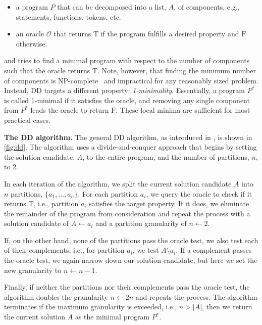 \documentclass[sigplan,screen]{acmart}
\newenvironment{vinlist}
{\begin{itemize}[leftmargin=1.5em]
  \setlength{\itemsep}{0pt}
  \setlength{\labelwidth}{0.75em}
\setlength{\parsep}{0pt}
\setlength{\topsep}{0pt}
  \setlength{\partopsep}{0pt}
  }
{\end{itemize}}
\newcommand{\heading}[1]{\vspace{4pt}\noindent\textbf{#1.}}
\begin{document}
\begin{vinlist}
    \item a program $P$ that can be decomposed into a list, $A$, of components, e.g., statements, functions, tokens, etc.
    \item an oracle $\mathcal{O}$ that returns $\mathrm{T}$ if the program fulfills a desired property and $\mathrm{F}$ otherwise.
\end{vinlist}
and tries to find a minimal program with respect to the number of components such that the oracle returns $\mathrm{T}$.
Note, however, that finding the minimum number of components is NP-complete~\cite{delta2002} and impractical for any reasonably sized problem.
Instead, DD targets a different property: \textit{1-minimality}.
Essentially, a program $P^{*}$ is called 1-minimal if it satisfies the oracle, and removing any single component from $P^{*}$ leads the oracle to return $\mathrm{F}$.
These local minima are sufficient for most practical cases.





\heading{The DD algorithm}
The general DD algorithm, as introduced in \cite{deltarl2018}, is shown in \cref{fig:dd}.
The algorithm uses a divide-and-conquer approach that begins by setting the solution candidate, $A$, to the entire program, and the number of partitions, $n$, to 2.

In each iteration of the algorithm, we split the current solution candidate $A$ into $n$ partitions, $\{a_1, \dots, a_n\}$.
For each partition $a_i$, we query the oracle to check if it returns $\mathrm{T}$, i.e., partition $a_i$ satisfies the target property.
If it does, we eliminate the remainder of the program from consideration and repeat the process with a solution candidate of $A \gets a_i$ and a partition granularity of $n \gets 2$.

If, on the other hand, none of the partitions pass the oracle test, we also test each of their complements, i.e., for partition $a_i$, we test $A\setminus a_i$.
If a complement passes the oracle test, we again narrow down our solution candidate, but here we set the new granularity to $n \gets n - 1$.

Finally, if neither the partitions nor their complements pass the oracle test, the algorithm doubles the granularity $n \gets 2n$ and repeats the process.
The algorithm terminates if the maximum granularity is exceeded, i.e., $n > |A|$, then we return the current solution $A$ as the minimal program $P^{*}$.
\end{document}
